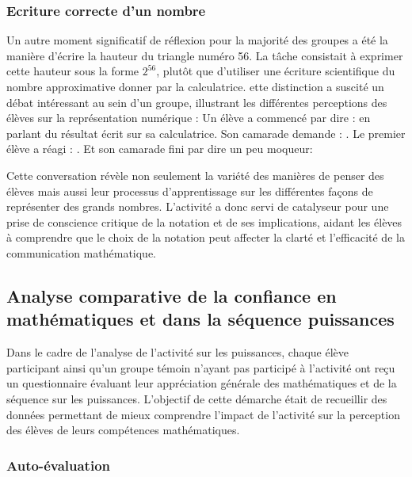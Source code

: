 \subsubsection{Ecriture correcte d'un nombre}

Un autre moment significatif de réflexion pour la majorité des groupes a été la manière d'écrire la hauteur du triangle numéro 56.
La tâche consistait à exprimer cette hauteur sous la forme $2^{56}$,
plutôt que d'utiliser une écriture scientifique du nombre approximative donner par la calculatrice.
ette distinction a suscité un débat intéressant au sein d'un groupe,
illustrant les différentes perceptions des élèves sur la représentation numérique :
Un élève a commencé par dire :  en parlant du résultat écrit sur sa calculatrice.
Son camarade demande : .
Le premier élève a réagi : .
Et son camarade fini par dire un peu moqueur: 


Cette conversation révèle non seulement la variété des manières de penser des élèves mais aussi leur processus d'apprentissage sur les différentes façons de représenter des grands nombres.
L'activité a donc servi de catalyseur pour une prise de conscience critique de la notation et de ses implications,
aidant les élèves à comprendre que le choix de la notation peut affecter la clarté et l'efficacité de la communication mathématique.

\subsection{Analyse comparative de la confiance en mathématiques et dans la séquence puissances}

Dans le cadre de l'analyse de l'activité sur les puissances,
chaque élève participant ainsi qu'un groupe témoin n'ayant pas participé à l'activité ont reçu un questionnaire  évaluant leur appréciation générale des mathématiques et de la séquence sur les puissances.
L'objectif de cette démarche était de recueillir des données permettant de mieux comprendre l'impact de l'activité sur la perception des élèves de leurs compétences mathématiques.\\

\subsubsection{Auto-évaluation}

